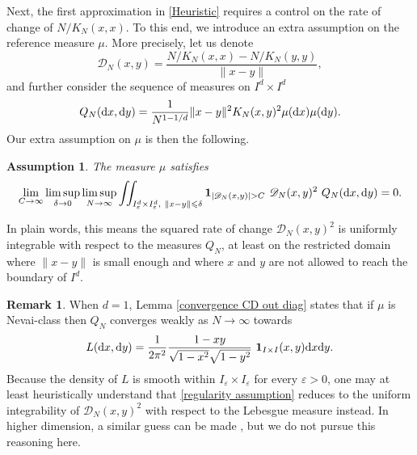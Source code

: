 \documentclass[a4paper,11pt]{article}
\numberwithin{equation}{section}
\newtheorem{assumption}{Assumption}[]
\theoremstyle{definition}
\newtheorem{Remark}[]{Remark}
\newenvironment{remark}{\begin{Remark}\rm}{\end{Remark}}
\newcommand{\eq}{\begin{equation}}
\newcommand{\qe}{\end{equation}}
\newcommand{\bs}{\boldsymbol}
\newcommand{\bv}{\mathbf}
\renewcommand{\leq}{\leqslant}
\renewcommand{\epsilon}{\varepsilon}
\renewcommand{\d}{ {\rm d}}
\begin{document}
Next, the first approximation in \eqref{Heuristic} requires a control on the
rate of change of $N/K_N(x,x)$. To this end, we introduce an extra assumption on
the reference measure $\mu$. More precisely, let us denote
\eq
\mathscr D_{N}(x,y)=\frac{N/K_N(x,x)- N/K_N(y,y)}{\|x-y\|},
\label{e:defDN}
\qe
and further consider the sequence of measures on $I^d\times I^d$
\eq
\label{e:defQN}
Q_N(\d x,\d y)= \frac1{N^{1-1/d}}\|x-y\|^2 K_N(x,y)^2\mu(\d x)\mu(\d y).
\qe
Our extra assumption on $\mu$ is then the following.
\begin{assumption}
\label{a:regularity assumption}
The measure $\mu$ satisfies
\eq
\label{regularity assumption}
\lim_{C\to\infty}\limsup_{\delta\to 0}\limsup_{N\to\infty}\iint_{I^d_{\epsilon}\times I^d_{\epsilon},\ \|x-y\|\leq \delta} \bv 1_{\left|\mathscr D_N(x,y)\right|> C}\ \mathscr D_N(x,y)^2\ Q_N(\d x,\d y)=0.
\qe
\end{assumption}
In plain words, this means the squared rate of change $\mathscr D_{N}(x,y)^2$ is
uniformly integrable with respect to the measures $Q_N$, at least on the
restricted domain where $\|x-y\|$ is small enough and where $x$ and $y$ are not
allowed to reach the boundary of $I^d$.

\begin{remark} When $d=1$, Lemma \ref{convergence CD out diag} states that if $\mu$ is Nevai-class then  $Q_N$
converges weakly as $N\to\infty$  towards
$$
L(\d x,\d y)=\frac1{2\pi^2}\frac{1-xy}{\sqrt{1-x^2}\sqrt{1-y^2}} \ \bs 1_{I\times I}(x,y)\d x\d y.
$$
Because the density of $L$ is smooth within $I_\epsilon\times I_\epsilon$ for
every $\epsilon>0$, one may at least heuristically understand that
\eqref{regularity assumption} reduces to the uniform integrability of $\mathscr D_N(x,y)^2$ with
respect to the Lebesgue measure instead. In higher dimension, a similar guess
can be made%
, but we do not pursue
this reasoning here.
\end{remark}
\end{document}
